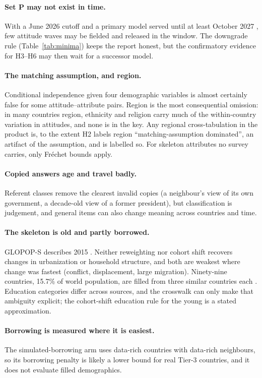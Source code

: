 \documentclass[10pt]{article}
\begin{document}
\paragraph{Set P may not exist in time.} With a June 2026 cutoff and a primary model served until at least October 2027 \citep{claudemodels}, few attitude waves may be fielded and released in the window. The downgrade rule (Table~\ref{tab:minima}) keeps the report honest, but the confirmatory evidence for H3--H6 may then wait for a successor model.

\paragraph{The matching assumption, and region.} Conditional independence given four demographic variables is almost certainly false for some attitude--attribute pairs. Region is the most consequential omission: in many countries region, ethnicity and religion carry much of the within-country variation in attitudes, and none is in the key. Any regional cross-tabulation in the product is, to the extent H2 labels region ``matching-assumption dominated'', an artifact of the assumption, and is labelled so. For skeleton attributes no survey carries, only Fréchet bounds apply.

\paragraph{Copied answers age and travel badly.} Referent classes remove the clearest invalid copies (a neighbour's view of its own government, a decade-old view of a former president), but classification is judgement, and general items can also change meaning across countries and time.

\paragraph{The skeleton is old and partly borrowed.} GLOPOP-S describes 2015 \citep{ton2024glopop}. Neither reweighting nor cohort shift recovers changes in urbanization or household structure, and both are weakest where change was fastest (conflict, displacement, large migration). Ninety-nine countries, 15.7\% of world population, are filled from three similar countries each \citep{ton2024glopop}. Education categories differ across sources, and the crosswalk can only make that ambiguity explicit; the cohort-shift education rule for the young is a stated approximation.

\paragraph{Borrowing is measured where it is easiest.} The simulated-borrowing arm uses data-rich countries with data-rich neighbours, so its borrowing penalty is likely a lower bound for real Tier-3 countries, and it does not evaluate filled demographics.
\end{document}
